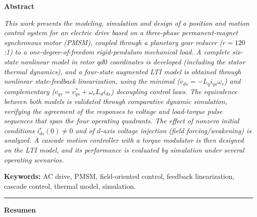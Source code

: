 \documentclass[12pt, a4paper,journal, onecolumn, compsoc]{IEEEtran}
\begin{document}
\setcounter{page}{1}
\thispagestyle{fancy}

\vspace*{-1cm}
\noindent\textbf{\large Abstract}
\vspace{4pt}

\noindent\textit{This work presents the modeling, simulation and design of a position and motion control system for an electric drive based on a three-phase permanent-magnet synchronous motor (PMSM), coupled through a planetary gear reducer ($r=120$:1) to a one-degree-of-freedom rigid-pendulum mechanical load. A complete six-state nonlinear model in rotor $qd0$ coordinates is developed (including the stator thermal dynamics), and a four-state augmented LTI model is obtained through nonlinear state-feedback linearization, using the minimal ($v_{ds}=-L_q i_{qs}\omega_r$) and complementary ($v_{qs}=v_{qs}^{*}+\omega_r L_d i_{ds}$) decoupling control laws. The equivalence between both models is validated through comparative dynamic simulation, verifying the agreement of the responses to voltage and load-torque pulse sequences that span the four operating quadrants. The effect of nonzero initial conditions $i_{ds}^{r}(0)\neq 0$ and of $d$-axis voltage injection (field forcing/weakening) is analyzed. A cascade motion controller with a torque modulator is then designed on the LTI model, and its performance is evaluated by simulation under several operating scenarios.}

\vspace{6pt}
\noindent\textbf{Keywords:} AC drive, PMSM, field-oriented control, feedback linearization, cascade control, thermal model, simulation.

\vspace{8pt}
\noindent\rule{\textwidth}{0.4pt}
\vspace{4pt}

\noindent\textbf{\large Resumen}
\vspace{4pt}
\end{document}
